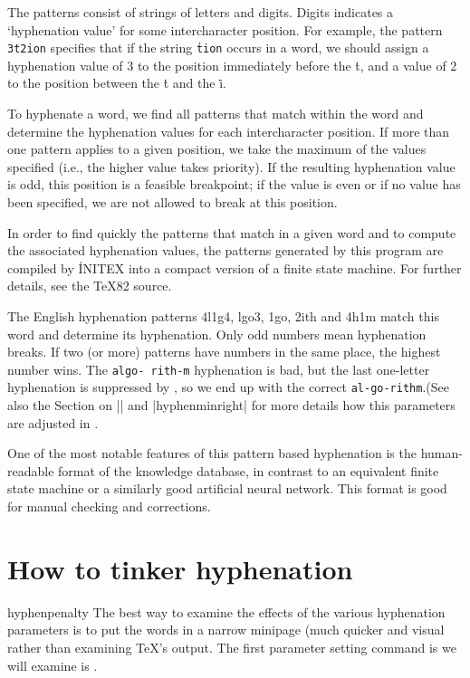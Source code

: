 The patterns consist of strings of letters and digits. Digits
indicates a `hyphenation value' for some intercharacter position.  For
example, the pattern \texttt{\.{3t2ion}} specifies that if the string \texttt{\.{tion}}
occurs in a word, we should assign a hyphenation value of 3 to the
position immediately before the \.{t}, and a value of 2 to the position
between the \.{t} and the \.{i}.

To hyphenate a word, we find all patterns that match within the word and
determine the hyphenation values for each intercharacter position.  If
more than one pattern applies to a given position, we take the maximum of
the values specified (i.e., the higher value takes priority).  If the
resulting hyphenation value is odd, this position is a feasible
breakpoint; if the value is even or if no value has been specified, we are
not allowed to break at this position.

In order to find quickly the patterns that match in a given word and to
compute the associated hyphenation values, the patterns generated by this
program are compiled by \.{INITEX} into a compact version of a finite
state machine.  For further details, see the \TeX 82 source.


The
\tex English hyphenation patterns 4l1g4, lgo3, 1go,
2ith and 4h1m match this word and determine its
hyphenation. Only odd numbers mean hyphenation
breaks. If two (or more) patterns have numbers in
the same place, the highest number wins. The \texttt{algo-
rith-m} hyphenation is bad, but the last one-letter
hyphenation is suppressed by \tex, so we end up with
the correct \texttt{al-go-rithm}.(See also the Section on |\hyphenminleft| and |hyphenminright| for more details
how this parameters are adjusted in \tex.

One of the most notable features of this pattern based
hyphenation is the human-readable format of
the knowledge database, in contrast to an equivalent
finite state machine or a similarly good artificial neural
network. This format is good for manual checking and
corrections.



\section*{How to tinker hyphenation}

\begin{docCommand}{hyphenpenalty}{}
The best way to examine the effects of the various hyphenation parameters
is to put the words in a narrow minipage (much quicker and visual rather than examining TeX's output. The first parameter setting command is we will examine is .
\end{docCommand}

